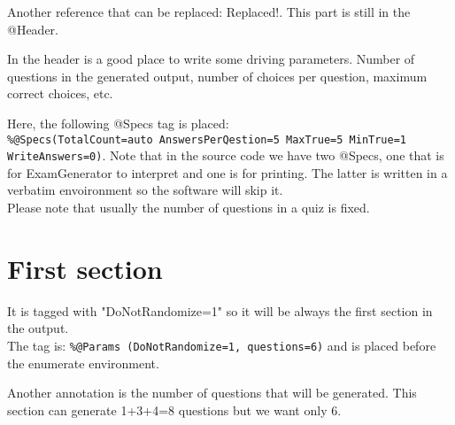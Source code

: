 \documentclass[a4paper,10pt]{article}%
\begin{document}
\large
Another reference that can be replaced: Replaced!. This part is still in the @Header.
\normalsize

In the header is a good place to write some driving parameters. Number of questions in the generated output, number of choices per question, maximum correct choices, etc.

Here, the following @Specs tag is placed:\\ \verb+%@Specs(TotalCount=auto AnswersPerQestion=5 MaxTrue=5 MinTrue=1 WriteAnswers=0)+. Note that in the source code we have two @Specs, one that is for ExamGenerator to interpret and one is for printing. The latter is written in a verbatim envoironment so the software will skip it. \\



Please note that usually the number of questions in a quiz is fixed.

 \setlength{\itemsep}{1pt}
 \setlength{\parskip}{0pt}
 \setlength{\parsep}{0pt}

\section{First section}
It is tagged with "DoNotRandomize=1" so it will be always the first section in the output. \\The tag is: \verb+%@Params (DoNotRandomize=1, questions=6)+ and is placed before the enumerate environment.

Another annotation is the number of questions that will be generated. This section can generate 1+3+4=8 questions but we want only 6.
\end{document}
